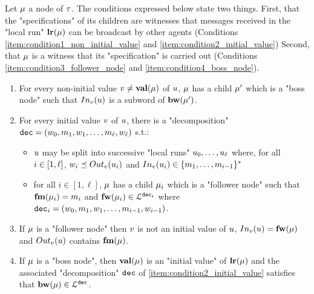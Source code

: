 Let $\mu$ a node of $\tau$. 
The conditions expressed below state two things. First, that the "specifications" of its children are witnesses that messages received in the "local run" $\mathbf{lr}(\mu)$ can be broadcast by other agents (Conditions \ref{item:condition1_non_initial_value} and \ref{item:condition2_initial_value})
Second, that $\mu$ is a witness that its "specification" is carried out (Conditions \ref{item:condition3_follower_node} and \ref{item:condition4_boss_node}).
\begin{enumerate}[{Condition} (i)]
	\item \label{item:condition1_non_initial_value} For every non-initial value $v \ne \mathbf{val}(\mu)$ of $u$, $\mu$ has a child $\mu'$ which is a "boss node" such that $\vinput{\aval}{\localrun}$ is a subword of $\mathbf{bw}(\mu')$.
	
	\item \label{item:condition2_initial_value} For every initial value $v$ of $u$, there is a "decomposition" $\mathtt{dec} = (w_0, m_1, w_1, \ldots, m_{\ell}, w_{\ell})$ s.t.:
	\begin{itemize}
		\item $u$ may be split into successive "local runs" $u_0, \dots, u_{\ell}$ where, for all $i \in [1,\ell]$, $w_i \subword \voutput{\aval}{\localrun_i}$ and $\vinput{\aval}{\localrun_i} \in \set{m_1, \dots, m_{i-1}}^*$
		\item for all $i \in [1,\ell]$, $\mu$ has a child $\mu_i$ which is a "follower node" such that $\mathbf{fm}(\mu_i) = m_i$ and $\mathbf{fw}(\mu_i) \in\mathcal{L}^{\mathtt{\mathtt{dec}_i}}$ where $\mathtt{dec}_i = (w_0, m_1, w_1, \ldots, m_{i-1}, w_{i-1})$.	\end{itemize}
	
	\item \label{item:condition3_follower_node} If $\mu$ is a "follower node" then $v$ is not an initial value of $u$, $\vinput{\aval}{\localrun} = \followlabelword{\node}$ and 
	$\voutput{\aval}{\localrun}$ contains $\mathbf{fm}(\mu)$.

	\item \label{item:condition4_boss_node} If $\mu$ is a "boss node", then $\mathbf{val}(\mu)$ is an "initial value" of $\mathbf{lr}(\mu)$ and the associated "decomposition" $\mathtt{dec}$ of \ref{item:condition2_initial_value} satisfies that $\mathbf{bw}(\mu) \in \mathcal{L}^{\mathtt{\mathtt{dec}}}$.
\end{enumerate}

